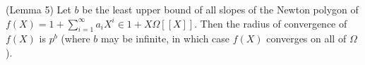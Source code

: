 (Lemma 5) Let $b$ be the least upper bound of all slopes of the Newton polygon of $f(X) = 1 + \sum_{i=1}^\infty a_i X^i \in 1 + X\Omega[[X]]$. Then the radius of convergence of $f(X)$ is $p^b$ (where $b$ may be infinite, in which case $f(X)$ converges on all of $\Omega$).